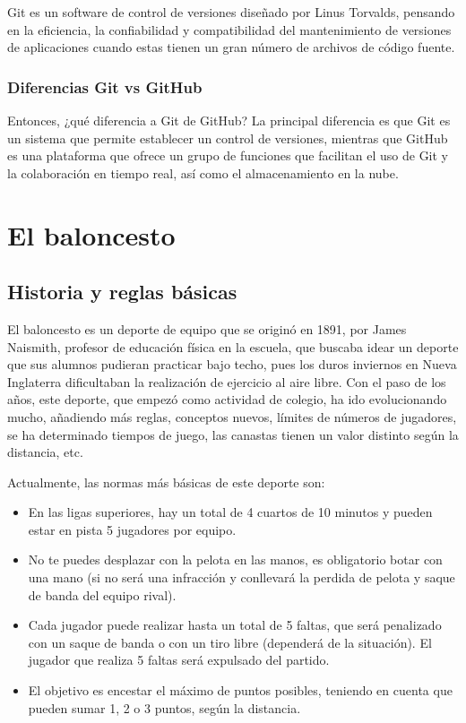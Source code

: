 \documentclass[paper=a4, fontsize=9pt]{article}
\begin{document}
Git es un software de control de versiones diseñado por Linus Torvalds, pensando en la eficiencia, la confiabilidad y compatibilidad del mantenimiento de versiones de aplicaciones cuando estas tienen un gran número de archivos de código fuente.

\subsubsection{Diferencias Git vs GitHub}

Entonces, ¿qué diferencia a Git de GitHub? La principal diferencia es que Git es un sistema que permite establecer un control de versiones, mientras que GitHub es una plataforma que ofrece un grupo de funciones que facilitan el uso de Git y la colaboración en tiempo real, así como el almacenamiento en la nube.

\section{El baloncesto}

\subsection{Historia y reglas básicas}

El baloncesto es un deporte de equipo que se originó en 1891, por James Naismith, profesor de educación física en la escuela, que buscaba idear un deporte que sus alumnos pudieran practicar bajo techo, pues los duros inviernos en Nueva Inglaterra dificultaban la realización de ejercicio al aire libre. Con el paso de los años, este deporte, que empezó como actividad de colegio, ha ido evolucionando mucho, añadiendo más reglas, conceptos nuevos, límites de números de jugadores, se ha determinado tiempos de juego, las canastas tienen un valor distinto según la distancia, etc.

Actualmente, las normas más básicas de este deporte son:

\begin{itemize}

   \item En las ligas superiores, hay un total de 4 cuartos de 10 minutos y pueden estar en pista 5 jugadores por equipo.
   \item No te puedes desplazar con la pelota en las manos, es obligatorio botar con una mano (si no será una infracción y conllevará la perdida de pelota y saque de banda del equipo rival).
   \item Cada jugador puede realizar hasta un total de 5 faltas, que será penalizado con un saque de banda o con un tiro libre (dependerá de la situación). El jugador que realiza 5 faltas será expulsado del partido.
   \item El objetivo es encestar el máximo de puntos posibles, teniendo en cuenta que pueden sumar 1, 2 o 3 puntos, según la distancia.
   
\end{itemize}
\end{document}
